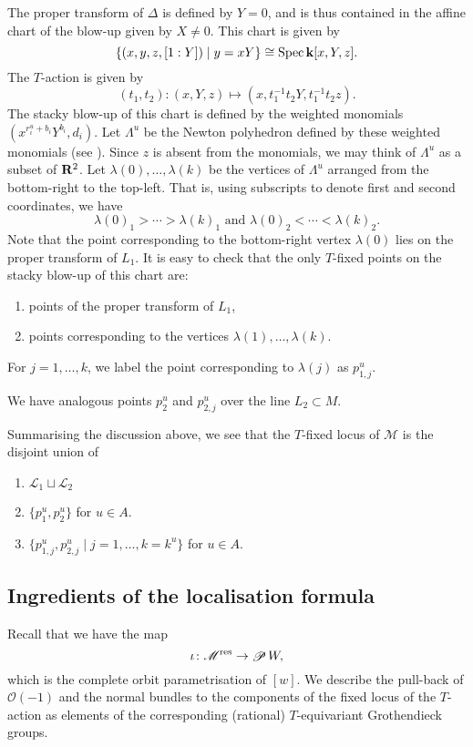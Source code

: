 \documentclass{amsart}
\renewcommand{\k}{\mathbf k}
\DeclareMathOperator{\sP}{\mathscr P}
\renewcommand{\O}{\mathcal O}
\begin{document}
The proper transform of \(\Delta\) is defined by \(Y = 0\), and is thus contained in the affine chart of the blow-up given by \(X \neq 0\).
This chart is given by
\[ \{(x,y,z,[1:Y]) \mid y = xY\} \cong \spec \k[x,Y,z].\]
The \(T\)-action is given by
\[ (t_1,t_2) \colon (x,Y,z) \mapsto (x, t_{1}^{-1}t_2Y, t_1^{-1}t_2z).\]
The stacky blow-up of this chart is defined by the weighted monomials \((x^{r_i^u+b_i}Y^{b_i}, d_i)\).
Let \(\Lambda^u\) be the Newton polyhedron defined by these weighted monomials (see ).
Since \(z\) is absent from the monomials, we may think of \(\Lambda^u\) as a subset of \({\bf R}^2\).
Let \(\lambda(0), \dots, \lambda(k)\) be the vertices of \(\Lambda^u\) arranged from the bottom-right to the top-left.
That is, using subscripts to denote first and second coordinates, we have
\[ \lambda(0)_1 > \cdots > \lambda(k)_1 \text{ and } \lambda(0)_2 < \cdots < \lambda(k)_2.\]
Note that the point corresponding to the bottom-right vertex \(\lambda(0)\) lies on the proper transform of \(L_1\).
It is easy to check that the only \(T\)-fixed points on the stacky blow-up of this chart are:
\begin{enumerate}
\item points of the proper transform of \(L_1\),
\item points corresponding to the vertices \(\lambda(1), \dots, \lambda(k)\).
\end{enumerate}
For \(j = 1,\dots,k\), we label the point corresponding to \(\lambda(j)\) as \(p_{1,j}^u\).

We have analogous points \(p_2^u\) and \(p_{2,j}^u\) over the line \(L_2 \subset M\).

Summarising the discussion above, we see that the \(T\)-fixed locus of \(\mathscr M\) is the disjoint union of 
\begin{enumerate}
\item \(\mathscr L_1 \sqcup \mathscr L_2\)
\item \(\{p_1^u, p_2^u\}\) for \(u \in A\).
\item \(\{p_{1,j}^u, p_{2,j}^u \mid j = 1, \dots, k = k^u\}\) for \(u \in A\).
\end{enumerate}

\subsection{Ingredients of the localisation formula}\label{sec:locingr}
Recall that we have the map \[\iota \colon \mathscr M^{\rm res} \to \sP W,\] which is the complete orbit parametrisation of \([w]\).
We describe the pull-back of \(\O(-1)\) and the normal bundles to the components of the fixed locus of the \(T\)-action as elements of the corresponding (rational) \(T\)-equivariant Grothendieck groups.
\end{document}
